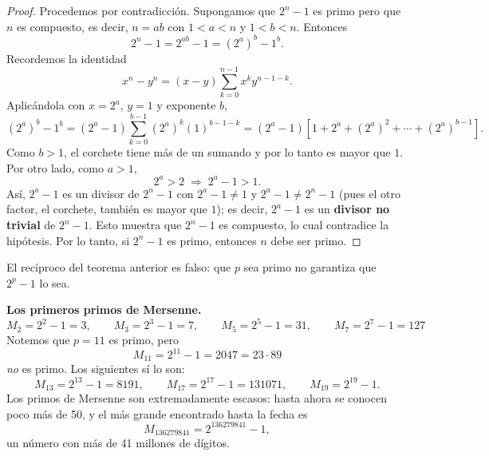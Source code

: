 \documentclass[12pt,a4paper]{book}
\begin{document}
  \begin{proof}
    Procedemos por contradicción. Supongamos que $2^n-1$ es primo pero que $n$ es compuesto, es decir, $n=ab$ con $1<a<n$ y $1<b<n$. Entonces
    \begin{equation*}
      2^n-1 = 2^{ab}-1 = (2^a)^b - 1^b.
    \end{equation*}
    Recordemos la identidad
    \begin{equation*}
      x^n-y^n = (x-y)\sum_{k=0}^{n-1} x^k y^{n-1-k}.
    \end{equation*}
    Aplicándola con $x=2^a$, $y=1$ y exponente $b$,
    \begin{equation*}
      (2^a)^b-1^b = (2^a-1)\sum_{k=0}^{b-1}(2^a)^k(1)^{b-1-k} = (2^a-1)\left[1+2^a+(2^a)^2+\cdots+(2^a)^{b-1}\right].
    \end{equation*}
    Como $b>1$, el corchete tiene más de un sumando y por lo tanto es mayor que $1$. Por otro lado, como $a>1$,
    \begin{equation*}
      2^a>2 \;\Rightarrow\; 2^a-1>1.
    \end{equation*}
    Así, $2^a-1$ es un divisor de $2^n-1$ con $2^a-1 \neq 1$ y $2^a-1 \neq 2^n-1$ (pues el otro factor, el corchete, también es mayor que $1$); es decir, $2^a-1$ es un \textbf{divisor no trivial} de $2^n-1$. Esto muestra que $2^n-1$ es compuesto, lo cual contradice la hipótesis. Por lo tanto, si $2^n-1$ es primo, entonces $n$ debe ser primo.
  \end{proof}
  
  El recíproco del teorema anterior es falso: que $p$ sea primo no garantiza que $2^p-1$ lo sea.
  
  \begin{ejemplo}
    \textbf{Los primeros primos de Mersenne.}
    \begin{equation*}
      M_2=2^2-1=3, \qquad M_3=2^3-1=7, \qquad M_5=2^5-1=31, \qquad M_7=2^7-1=127
    \end{equation*}
    Notemos que $p=11$ es primo, pero
    \begin{equation*}
      M_{11}=2^{11}-1=2047=23\cdot 89
    \end{equation*}
    \emph{no} es primo. Los siguientes sí lo son:
    \begin{equation*}
      M_{13}=2^{13}-1=8191, \qquad M_{17}=2^{17}-1=131071, \qquad M_{19}=2^{19}-1.
    \end{equation*}
    Los primos de Mersenne son extremadamente escasos: hasta ahora se conocen poco más de 50, y el más grande encontrado hasta la fecha es
    \begin{equation*}
      M_{136279841}=2^{136279841}-1,
    \end{equation*}
    un número con más de 41 millones de dígitos.
  \end{ejemplo}
  
\end{document}

